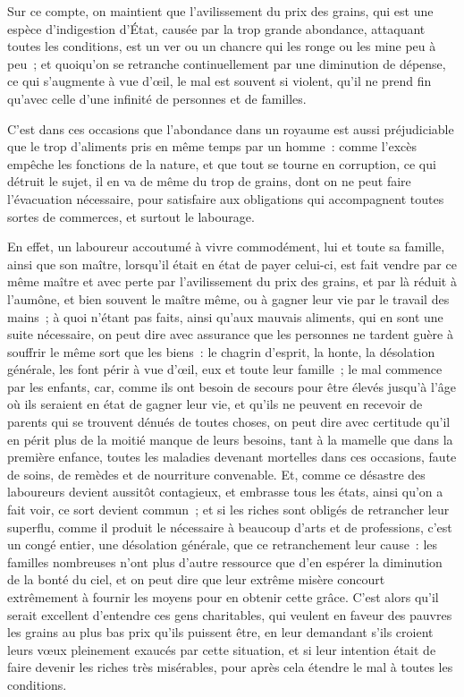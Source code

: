 \documentclass[french,twoside]{book} %
\begin{document}
Sur ce compte, on maintient que l’avilissement du prix des grains, qui est une espèce d’indigestion d’État, causée par la trop grande abondance, attaquant toutes les conditions, est un ver ou un chancre qui les ronge ou les mine peu à peu ; et quoiqu’on se retranche continuellement par une diminution de dépense, ce qui s’augmente à vue d’œil, le mal est souvent si violent, qu’il ne prend fin qu’avec celle d’une infinité de personnes et de familles.\par
C’est dans ces occasions que l’abondance dans un royaume est aussi préjudiciable que le trop d’aliments pris en même temps par un homme : comme l’excès empêche les fonctions de la nature, et que tout se tourne en corruption, ce qui détruit le sujet, il en va de même du trop de grains, dont on ne peut faire l’évacuation nécessaire, pour satisfaire aux obligations qui accompagnent toutes sortes de commerces, et surtout le labourage.\par
En effet, un laboureur accoutumé à vivre commodément, lui et toute sa famille, ainsi que son maître, lorsqu’il était en état de payer celui-ci, est fait vendre par ce même maître et avec perte par l’avilissement du prix des grains, et par là réduit à l’aumône, et bien souvent le maître même, ou à gagner leur vie par le travail des mains ; à quoi n’étant pas faits, ainsi qu’aux mauvais aliments, qui en sont une suite nécessaire, on peut dire avec assurance que les personnes ne tardent guère à souffrir le même sort que les biens : le chagrin d’esprit, la honte, la désolation générale, les font périr à vue d’œil, eux et toute leur famille ; le mal commence par les enfants, car, comme ils ont besoin de secours pour être élevés jusqu’à l’âge où ils seraient en état de gagner leur vie, et qu’ils ne peuvent en recevoir de parents qui se trouvent dénués de toutes choses, on peut dire avec certitude qu’il en périt plus de la moitié manque de leurs besoins, tant à la mamelle que dans la première enfance, toutes les maladies devenant mortelles dans ces occasions, faute de soins, de remèdes et de nourriture convenable. Et, comme ce désastre des laboureurs devient aussitôt contagieux, et embrasse tous les états, ainsi qu’on a fait voir, ce sort devient commun ; et si les riches sont obligés de retrancher leur superflu, comme il produit le nécessaire à beaucoup d’arts et de professions, c’est un congé entier, une désolation générale, que ce retranchement leur cause : les familles nombreuses n’ont plus d’autre ressource que d’en espérer la diminution de la bonté du ciel, et on peut dire que leur extrême misère concourt extrêmement à fournir les moyens pour en obtenir cette grâce. C’est alors qu’il serait excellent d’entendre ces gens charitables, qui veulent en faveur des pauvres les grains au plus bas prix qu’ils puissent être, en leur demandant s’ils croient leurs vœux pleinement exaucés par cette situation, et si leur intention était de faire devenir les riches très misérables, pour après cela étendre le mal à toutes les conditions.\par
\end{document}
